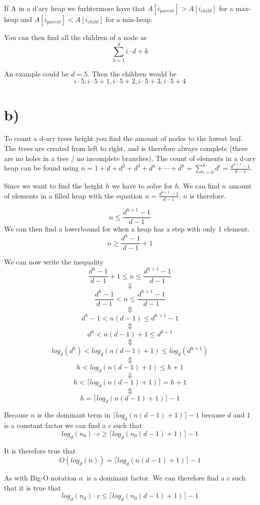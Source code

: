 \documentclass{article}
\begin{document}
If A in a d'ary heap we furhtermore have that $A[i_{parent}] > A[i_{child}]$ for a max-heap and $A[i_{parent}] < A[i_{child}]$ for a min-heap.

You can then find all the children of a node as
$$\sum_{k=1}^{d}i\cdot d + k$$

An example could be $d=5$. Then the children would be
$$i \cdot5, i \cdot 5 + 1, i \cdot 5 + 2, i \cdot 5 + 3, i \cdot 5 + 4$$


\section*{b)}
To count a d-ary trees height you find the amount of nodes to the lowest leaf. The trees are created from left to right, and is therefore always complete (there are no holes in a tree / no incomplete branches).
The count of elements in a d-ary heap can be found using $n=1 + d + d^2 + d^3 + d^4 + \cdots + d^h=\sum_{i=0}^{h}d^i = \frac{d^{h+1}-1}{d-1}$.

Since we want to find the height $h$ we have to solve for $h$.
We can find $n$ amount of elements in a filled heap with the equation $n = \frac{d^{h+1}-1}{d-1}$. $n$ is therefore.

$$n \leq \frac{d^{h+1}-1}{d-1}$$
We can then find a lowerbound for when a heap has a step with only $1$ element.
$$n \geq \frac{d^{h}-1}{d-1} + 1$$

We can now write the inequality
$$\frac{d^{h}-1}{d-1} + 1 \leq n \leq \frac{d^{h+1}-1}{d-1}$$
$$\Downarrow$$
$$\frac{d^{h}-1}{d-1} < n \leq \frac{d^{h+1}-1}{d-1}$$
$$\Updownarrow$$
$$d^{h}-1 < n(d-1) \leq d^{h+1}-1$$
$$\Updownarrow$$
$$d^{h} < n(d-1)+1 \leq d^{h+1}$$
$$\Updownarrow$$
$$log_d{(d^{h})} < log_d{(n(d-1)+1)} \leq log_d{(d^{h+1})}$$
$$\Updownarrow$$
$$h < log_d{(n(d-1)+1)} \leq h+1$$
$$\Downarrow$$
$$h < \lceil log_d{(n(d-1)+1)} \rceil = h+1$$
$$\Updownarrow$$
$$h = \lceil log_d{(n(d-1)+1)} \rceil - 1$$

Because $n$ is the dominant term in $\lceil log_d{(n(d-1)+1)} \rceil - 1$ because $d$ and $1$ is a constant factor we can find a $c$ such that
$$log_d{(n_0)}\cdot c \geq \lceil log_d{(n_0(d-1)+1)} \rceil - 1$$

It is therefore true that
$$O(log_d{(n)}) = \lceil log_d{(n(d-1)+1)} \rceil - 1$$

As with Big-O notation $n$ is a dominant factor. We can therefore find a $c$ such that it is true that
$$log_d{(n_0)}\cdot c \leq \lceil log_d{(n_0(d-1)+1)} \rceil - 1$$
\end{document}
